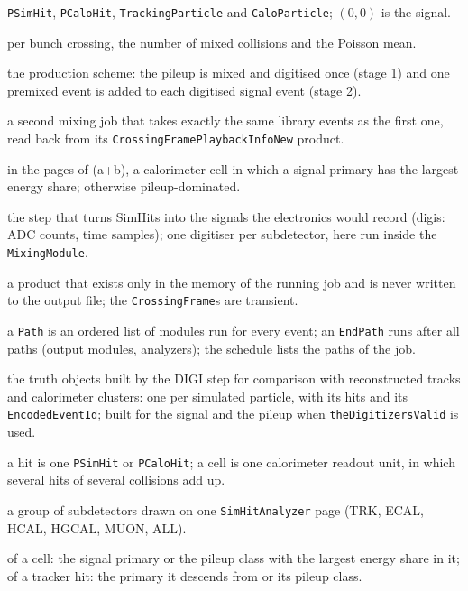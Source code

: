 \documentclass[11pt,a4paper]{article}
\newcommand{\code}[1]{\texttt{#1}}
\begin{document}
\begin{description}[style=sameline,leftmargin=0pt,itemsep=2pt]
  \code{PSimHit}, \code{PCaloHit}, \code{TrackingParticle} and \code{CaloParticle}; $(0,0)$ is the signal.
\item[PileupSummaryInfo] per bunch crossing, the number of mixed collisions and the Poisson mean.
\item[premixing] the production scheme: the pileup is mixed and digitised once (stage 1) and one premixed
  event is added to each digitised signal event (stage 2).
\item[playback] a second mixing job that takes exactly the same library events as the first one, read back
  from its \code{CrossingFramePlaybackInfoNew} product.
\item[signal-dominated cell] in the pages of (a+b), a calorimeter cell in which a signal primary has the
  largest energy share; otherwise pileup-dominated.
\item[DIGI step, digitiser] the step that turns SimHits into the signals the electronics would record
  (digis: ADC counts, time samples); one digitiser per subdetector, here run inside the \code{MixingModule}.
\item[transient product] a product that exists only in the memory of the running job and is never written to
  the output file; the \code{CrossingFrame}s are transient.
\item[Path, EndPath, schedule] a \code{Path} is an ordered list of modules run for every event; an
  \code{EndPath} runs after all paths (output modules, analyzers); the schedule lists the paths of the job.
\item[TrackingParticle, CaloParticle] the truth objects built by the DIGI step for comparison with
  reconstructed tracks and calorimeter clusters: one per simulated particle, with its hits and its
  \code{EncodedEventId}; built for the signal and the pileup when \code{theDigitizersValid} is used.
\item[hit, cell] a hit is one \code{PSimHit} or \code{PCaloHit}; a cell is one calorimeter readout unit, in
  which several hits of several collisions add up.
\item[station] a group of subdetectors drawn on one \code{SimHitAnalyzer} page (TRK, ECAL, HCAL, HGCAL, MUON,
  ALL).
\item[owner] of a cell: the signal primary or the pileup class with the largest energy share in it; of a
  tracker hit: the primary it descends from or its pileup class.
\end{description}
\end{document}
